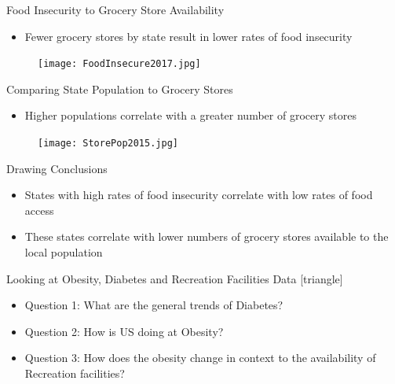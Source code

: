 \documentclass{beamer} %
\begin{document}
  

\begin{frame}{Food Insecurity to Grocery Store Availability}
 \begin{itemize}
  \item Fewer grocery stores by state result in lower rates of food insecurity
 \end{itemize}
 \begin{figure}
   \texttt{[image: FoodInsecure2017.jpg]}
   \hfill
 \end{figure}
\end{frame}


\begin{frame}{Comparing State Population to Grocery Stores}
 \begin{itemize}
  \item Higher populations correlate with a greater number of grocery stores
 \end{itemize}
 \begin{figure}
   \texttt{[image: StorePop2015.jpg]}
   \hfill
 \end{figure}
\end{frame}



\begin{frame}{Drawing Conclusions}
  \begin{itemize}
    \item States with high rates of food insecurity correlate with low rates of food access
    \item These states correlate with lower numbers of grocery stores available to the local population
  \end{itemize}
\end{frame}



\begin{frame}{Looking at Obesity, Diabetes and Recreation Facilities Data}
  [triangle]

    \begin{itemize}
      \item Question 1: What are the general trends of Diabetes?
      \item Question 2: How is US doing at Obesity?
      \item Question 3: How does the obesity change in context to the availability of Recreation facilities?
    \end{itemize}

\end{frame}
\end{document}
